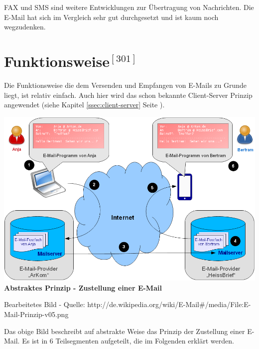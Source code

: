 \documentclass[12pt,a4paper]{report}
\begin{document}
\begin{onehalfspace}
FAX und SMS sind weitere Entwicklungen zur Übertragung von Nachrichten. Die E-Mail hat sich im Vergleich sehr gut durchgesetzt und ist kaum noch wegzudenken. 
\section*{Funktionsweise$^{[301]}$}
Die Funktionsweise die dem Versenden und Empfangen von E-Mails zu Grunde liegt, ist relativ einfach. Auch hier wird das schon bekannte Client-Server Prinzip angewendet (siehe Kapitel \ref{ssec:client-server} Seite \pageref{ssec:client-server}).\\

\begin{center}
\includegraphics[scale=0.6]{../docs/lyaton/graphics/E-Mail-Prinzip.png}\\
\textbf{Abstraktes Prinzip - Zustellung einer E-Mail}\\
\begin{scriptsize}
Bearbeitetes Bild - Quelle: http://de.wikipedia.org/wiki/E-Mail\#/media/File:E-Mail-Prinzip-v05.png
\end{scriptsize}
\end{center}
\vspace{0.5cm}

Das obige Bild beschreibt auf abstrakte Weise das Prinzip der Zustellung einer E-Mail. Es ist in 6 Teilsegmenten aufgeteilt, die im Folgenden erklärt werden.


\end{onehalfspace}
\end{document}
